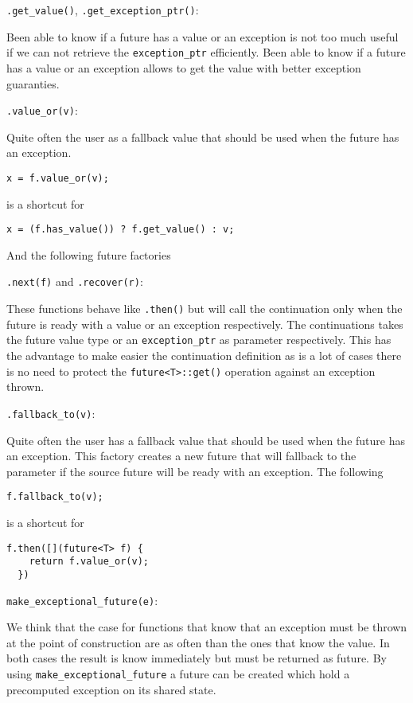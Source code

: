 \documentclass[a4paper,10pt]{article}
\newcommand{\cpp}[1]{\lstinline{#1}}
\begin{document}
\cpp{.get_value()}, \cpp{.get_exception_ptr()}:

Been able to know if a future has a value or an exception is not too much useful if we can not retrieve the \cpp{exception_ptr} efficiently. Been able to know if a future has a value or an exception allows to get the value with better exception guaranties.

\cpp{.value_or(v)}:

Quite often the user as a fallback value that should be used when the future has an exception.

\begin{lstlisting}[xleftmargin=0pt]
x = f.value_or(v);
\end{lstlisting}

is a shortcut for  

\begin{lstlisting}[xleftmargin=0pt]
x = (f.has_value()) ? f.get_value() : v;
\end{lstlisting}

And the following future factories

\cpp{.next(f)} and \cpp{.recover(r)}:

These functions behave like \cpp{.then()} but will call the continuation only when the future is ready with a value or an exception respectively. The continuations takes the future value type or an \cpp{exception_ptr} as parameter respectively. This has the advantage to make easier the continuation definition as is a lot of cases there is no need to protect the \cpp{future<T>::get()} operation against an exception thrown.

\cpp{.fallback_to(v)}:

Quite often the user has a fallback value that should be used when the future has an exception. This factory creates a new future that will fallback to the parameter if the source future will be ready with an exception. The following 

\begin{lstlisting}[xleftmargin=0pt]
  f.fallback_to(v);
\end{lstlisting}

is a shortcut for 

\begin{lstlisting}[xleftmargin=0pt]
  f.then([](future<T> f) {
    return f.value_or(v);
  })
\end{lstlisting}

\cpp{make_exceptional_future(e)}:

We think that the case for functions that know that an exception must be thrown at the point of construction are as often than the ones that know the value. In both cases the result is know immediately but must be returned as future. By using \cpp{make_exceptional_future} a future can be created which hold a precomputed exception on its shared state. 
\end{document}
